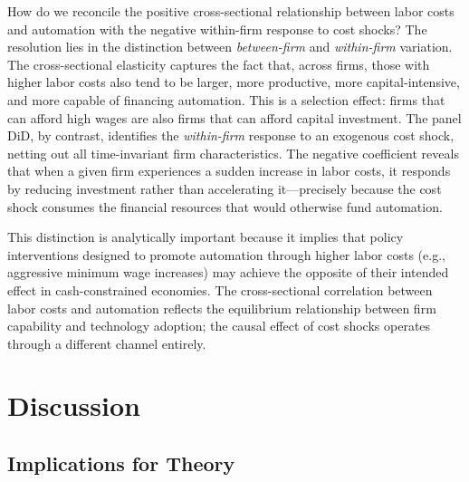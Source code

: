 \documentclass[5p,times,authoryear]{elsarticle}
\begin{document}
How do we reconcile the positive cross-sectional relationship between labor costs and automation with the negative within-firm response to cost shocks? The resolution lies in the distinction between \emph{between-firm} and \emph{within-firm} variation. The cross-sectional elasticity captures the fact that, across firms, those with higher labor costs also tend to be larger, more productive, more capital-intensive, and more capable of financing automation. This is a selection effect: firms that can afford high wages are also firms that can afford capital investment. The panel DiD, by contrast, identifies the \emph{within-firm} response to an exogenous cost shock, netting out all time-invariant firm characteristics. The negative coefficient reveals that when a given firm experiences a sudden increase in labor costs, it responds by reducing investment rather than accelerating it---precisely because the cost shock consumes the financial resources that would otherwise fund automation.

This distinction is analytically important because it implies that policy interventions designed to promote automation through higher labor costs (e.g., aggressive minimum wage increases) may achieve the opposite of their intended effect in cash-constrained economies. The cross-sectional correlation between labor costs and automation reflects the equilibrium relationship between firm capability and technology adoption; the causal effect of cost shocks operates through a different channel entirely.

\FloatBarrier


\section{Discussion}
\label{sec:policy}

\subsection{Implications for Theory}
\label{subsec:theory_implications}
\end{document}
